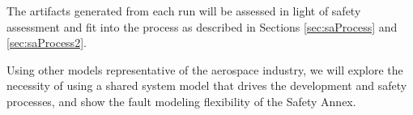 The artifacts generated from each run will be assessed in light of safety assessment and fit into the process as described in Sections \ref{sec:saProcess} and \ref{sec:saProcess2}.

Using other models representative of the aerospace industry, we will explore the necessity of using a shared system model that drives the development and safety processes, and show the fault modeling flexibility of the Safety Annex. 











